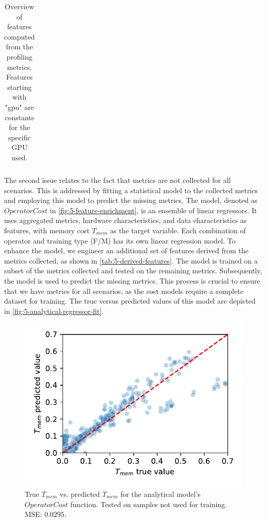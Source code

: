 \begin{table}[ht]
\begin{tabular}{p{0.19\linewidth}p{0.37\linewidth}>{\footnotesize}p{0.35\linewidth}}
        \bottomrule
    \end{tabular}
    \caption[Derived features]{Overview of features computed from the profiling metrics. Features starting with "gpu" are constants for the specific GPU used.}
    \label{tab:5-derived-features}
\end{table}

The second issue relates to the fact that metrics are not collected for all scenarios. This is addressed by fitting a statistical model to the collected metrics and employing this model to predict the missing metrics. The model, denoted as $OperatorCost$ in \autoref{fig:5-feature-enrichment}, is an ensemble of linear regressors. It uses aggregated metrics, hardware characteristics, and data characteristics as features, with memory cost $T_{mem}$ as the target variable. Each combination of operator and training type (F/M) has its own linear regression model.
To enhance the model, we engineer an additional set of features derived from the metrics collected, as shown in \autoref{tab:5-derived-features}.
The model is trained on a subset of the metrics collected and tested on the remaining metrics. Subsequently, the model is used to predict the missing metrics. This process is crucial to ensure that we have metrics for all scenarios, as the cost models require a complete dataset for training. The true versus predicted values of this model are depicted in \autoref{fig:5-analytical-regressor-fit}.

\begin{figure}[ht]
    \centering
    \includegraphics[width=0.5\linewidth]{chapters/05_cost_estimation/figures/analytical-regressor-fit.pdf}
    \caption[Analytical model memory cost prediction vs. true values]{True $T_{mem}$ vs. predicted $T_{mem}$ for the analytical model's $OperatorCost$ function. Tested on samples not used for training. MSE: $0.0295$.}
    \label{fig:5-analytical-regressor-fit}
\end{figure}

